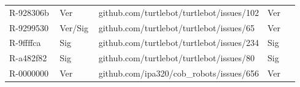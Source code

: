 \begin{longtable}{@{}ll>{\raggedright\arraybackslash}p{0.44\linewidth}>{\raggedright\arraybackslash}p{0.11\linewidth}@{}}
R-928306b & Ver & {\scriptsize\ttfamily github.com/\allowbreak{}turtlebot/\allowbreak{}turtlebot/\allowbreak{}issues/\allowbreak{}102} & Ver \\
R-9299530 & Ver/Sig & {\scriptsize\ttfamily github.com/\allowbreak{}turtlebot/\allowbreak{}turtlebot/\allowbreak{}issues/\allowbreak{}65} & Ver \\
R-9ffffca & Sig & {\scriptsize\ttfamily github.com/\allowbreak{}turtlebot/\allowbreak{}turtlebot/\allowbreak{}issues/\allowbreak{}234} & Sig \\
R-a482f82 & Sig & {\scriptsize\ttfamily github.com/\allowbreak{}turtlebot/\allowbreak{}turtlebot/\allowbreak{}issues/\allowbreak{}80} & Sig \\
R-0000000 & Ver & {\scriptsize\ttfamily github.com/\allowbreak{}ipa320/\allowbreak{}cob\_robots/\allowbreak{}issues/\allowbreak{}656} & Ver \\
\end{longtable}

